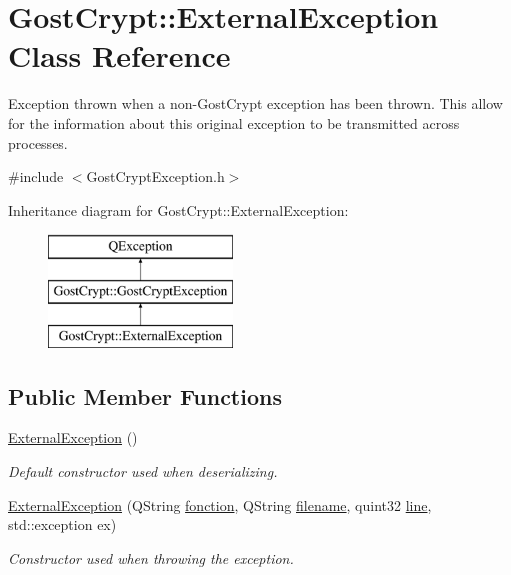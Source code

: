 \hypertarget{class_gost_crypt_1_1_external_exception}{}\section{Gost\+Crypt\+:\+:External\+Exception Class Reference}
\label{class_gost_crypt_1_1_external_exception}


Exception thrown when a non-\/\+Gost\+Crypt exception has been thrown. This allow for the information about this original exception to be transmitted across processes.  




{\ttfamily \#include $<$Gost\+Crypt\+Exception.\+h$>$}

Inheritance diagram for Gost\+Crypt\+:\+:External\+Exception\+:\begin{figure}[H]
\begin{center}
\leavevmode
\includegraphics[height=3.000000cm]{class_gost_crypt_1_1_external_exception}
\end{center}
\end{figure}
\subsection*{Public Member Functions}
\begin{DoxyCompactItemize}
\item 
\hyperlink{class_gost_crypt_1_1_external_exception_ad8a723481e9e8990ba3b7c88010c1ef4}{External\+Exception} ()
\begin{DoxyCompactList}\small\item\em Default constructor used when deserializing. \end{DoxyCompactList}\item 
\hyperlink{class_gost_crypt_1_1_external_exception_a3cbb68c9b2dd73dd51863fa458d00e61}{External\+Exception} (Q\+String \hyperlink{class_gost_crypt_1_1_gost_crypt_exception_a29b8c93d5efbb1ff369107385725a939}{fonction}, Q\+String \hyperlink{class_gost_crypt_1_1_gost_crypt_exception_a749a12375f4ba9d502623b99d8252f38}{filename}, quint32 \hyperlink{class_gost_crypt_1_1_gost_crypt_exception_abf506d911f12a4e969eea500f90bd32c}{line}, std\+::exception ex)
\begin{DoxyCompactList}\small\item\em Constructor used when throwing the exception. \end{DoxyCompactList}\end{DoxyCompactItemize}
